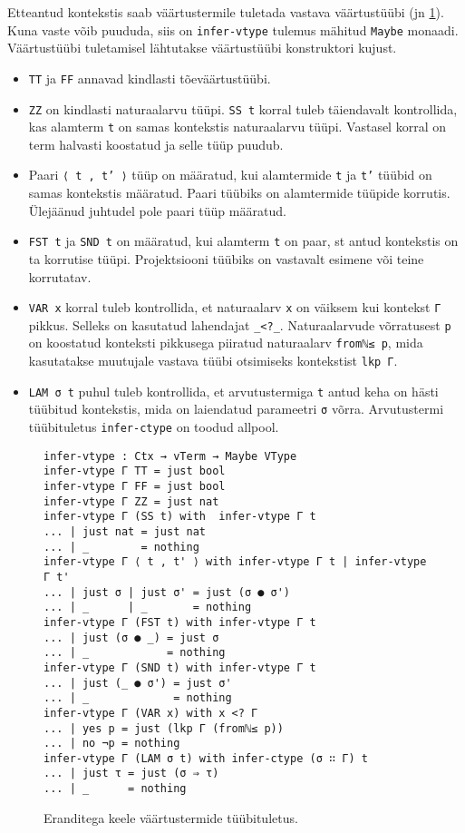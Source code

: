 \documentclass[a4paper,12pt]{article}
\begin{document}
Etteantud kontekstis saab väärtustermile tuletada vastava väärtustüübi (jn \ref{fig:exc.infer-vtype}).
Kuna vaste võib puududa, siis on {\tt infer-vtype} tulemus mähitud {\tt Maybe} monaadi.
Väärtustüübi tuletamisel lähtutakse väärtustüübi konstruktori kujust.
\begin{itemize}
\item {\tt TT} ja {\tt FF} annavad kindlasti tõeväärtustüübi.
\item {\tt ZZ} on kindlasti naturaalarvu tüüpi. {\tt SS t} korral tuleb täiendavalt kontrollida, kas alamterm {\tt t} on samas kontekstis naturaalarvu tüüpi. Vastasel korral on term halvasti koostatud ja selle tüüp puudub.
\item Paari {\tt ⟨ t , t' ⟩} tüüp on määratud, kui alamtermide {\tt t} ja {\tt t'} tüübid on samas kontekstis määratud. Paari tüübiks on alamtermide tüüpide korrutis. Ülejäänud juhtudel pole paari tüüp määratud.
\item {\tt FST t} ja {\tt SND t} on määratud, kui alamterm {\tt t} on paar, st antud kontekstis on ta korrutise tüüpi. Projektsiooni tüübiks on vastavalt esimene või teine korrutatav.
\item {\tt VAR x} korral tuleb kontrollida, et naturaalarv {\tt x} on väiksem kui kontekst {\tt Γ} pikkus. Selleks on kasutatud lahendajat {\tt _<?_}. Naturaalarvude võrratusest {\tt p} on koostatud konteksti pikkusega piiratud naturaalarv {\tt fromℕ≤ p}, mida kasutatakse muutujale vastava tüübi otsimiseks kontekstist {\tt lkp Γ}.
\item {\tt LAM σ t} puhul tuleb kontrollida, et arvutustermiga {\tt t} antud keha on hästi tüübitud kontekstis, mida on laiendatud parameetri {\tt σ} võrra. Arvutustermi tüübituletus {\tt infer-ctype} on toodud allpool.
\end{itemize}

\begin{figure}
  \begin{BVerbatim}
infer-vtype : Ctx → vTerm → Maybe VType
infer-vtype Γ TT = just bool
infer-vtype Γ FF = just bool
infer-vtype Γ ZZ = just nat
infer-vtype Γ (SS t) with  infer-vtype Γ t
... | just nat = just nat
... | _        = nothing
infer-vtype Γ ⟨ t , t' ⟩ with infer-vtype Γ t | infer-vtype Γ t'
... | just σ | just σ' = just (σ ● σ')
... | _      | _       = nothing
infer-vtype Γ (FST t) with infer-vtype Γ t
... | just (σ ● _) = just σ
... | _            = nothing
infer-vtype Γ (SND t) with infer-vtype Γ t
... | just (_ ● σ') = just σ'
... | _             = nothing
infer-vtype Γ (VAR x) with x <? Γ
... | yes p = just (lkp Γ (fromℕ≤ p))
... | no ¬p = nothing
infer-vtype Γ (LAM σ t) with infer-ctype (σ ∷ Γ) t
... | just τ = just (σ ⇒ τ)
... | _      = nothing
  \end{BVerbatim}
  \caption{Eranditega keele väärtustermide tüübituletus.}
  \label{fig:exc.infer-vtype}
\end{figure}
\end{document}
